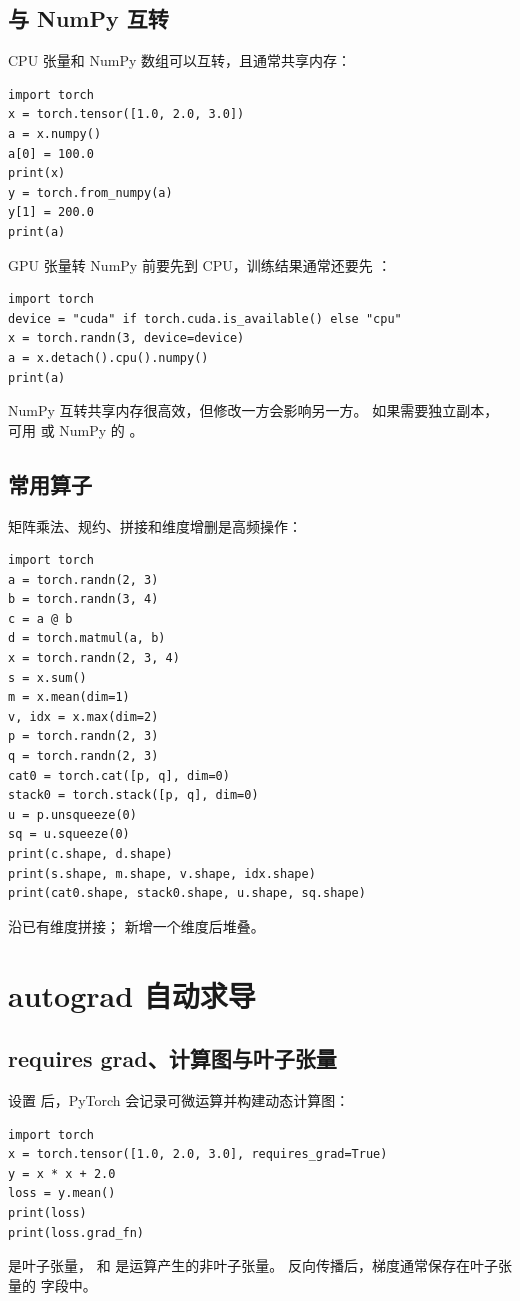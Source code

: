 \subsection{与 NumPy 互转}
CPU 张量和 NumPy 数组可以互转，且通常共享内存：
\begin{lstlisting}
import torch
x = torch.tensor([1.0, 2.0, 3.0])
a = x.numpy()
a[0] = 100.0
print(x)
y = torch.from_numpy(a)
y[1] = 200.0
print(a)
\end{lstlisting}
GPU 张量转 NumPy 前要先到 CPU，训练结果通常还要先 ：
\begin{lstlisting}
import torch
device = "cuda" if torch.cuda.is_available() else "cpu"
x = torch.randn(3, device=device)
a = x.detach().cpu().numpy()
print(a)
\end{lstlisting}
\begin{trap}
NumPy 互转共享内存很高效，但修改一方会影响另一方。
如果需要独立副本，可用  或 NumPy 的 。
\end{trap}

\subsection{常用算子}
矩阵乘法、规约、拼接和维度增删是高频操作：
\begin{lstlisting}
import torch
a = torch.randn(2, 3)
b = torch.randn(3, 4)
c = a @ b
d = torch.matmul(a, b)
x = torch.randn(2, 3, 4)
s = x.sum()
m = x.mean(dim=1)
v, idx = x.max(dim=2)
p = torch.randn(2, 3)
q = torch.randn(2, 3)
cat0 = torch.cat([p, q], dim=0)
stack0 = torch.stack([p, q], dim=0)
u = p.unsqueeze(0)
sq = u.squeeze(0)
print(c.shape, d.shape)
print(s.shape, m.shape, v.shape, idx.shape)
print(cat0.shape, stack0.shape, u.shape, sq.shape)
\end{lstlisting}
 沿已有维度拼接； 新增一个维度后堆叠。

\section{autograd 自动求导}
\subsection{requires grad、计算图与叶子张量}
设置  后，PyTorch 会记录可微运算并构建动态计算图：
\begin{lstlisting}
import torch
x = torch.tensor([1.0, 2.0, 3.0], requires_grad=True)
y = x * x + 2.0
loss = y.mean()
print(loss)
print(loss.grad_fn)
\end{lstlisting}
 是叶子张量， 和  是运算产生的非叶子张量。
反向传播后，梯度通常保存在叶子张量的  字段中。

